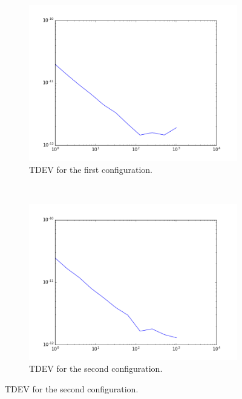 \begin{figure}[H]
    \begin{subfigure}[t]{.45\textwidth}
        \centering
        \includegraphics[width=\textwidth]{img/pps_p1.png}
        \caption{TDEV for the first configuration.}
        \label{fig:pps_p1}
    \end{subfigure}
    ~
    \begin{subfigure}[t]{.45\textwidth}
        \centering
        \includegraphics[width=\textwidth]{img/pps_p2.png}
        \caption{TDEV for the second configuration.}
        \label{fig:pps_p2}
    \end{subfigure}
    

\end{figure}
